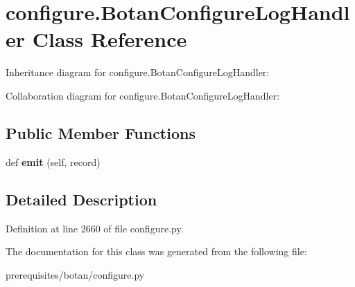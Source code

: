 \hypertarget{classconfigure_1_1_botan_configure_log_handler}{}\section{configure.\+Botan\+Configure\+Log\+Handler Class Reference}
\label{classconfigure_1_1_botan_configure_log_handler}


Inheritance diagram for configure.\+Botan\+Configure\+Log\+Handler\+:


Collaboration diagram for configure.\+Botan\+Configure\+Log\+Handler\+:
\subsection*{Public Member Functions}
\begin{DoxyCompactItemize}
\item 
\mbox{\label{classconfigure_1_1_botan_configure_log_handler_a5d47c80af52b0bee2921767186f2b499}} 
def {\bfseries emit} (self, record)
\end{DoxyCompactItemize}


\subsection{Detailed Description}


Definition at line 2660 of file configure.\+py.



The documentation for this class was generated from the following file\+:\begin{DoxyCompactItemize}
\item 
prerequisites/botan/configure.\+py\end{DoxyCompactItemize}
